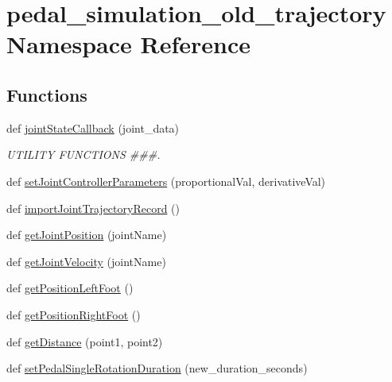 \hypertarget{namespacepedal__simulation__old__trajectory}{}\section{pedal\+\_\+simulation\+\_\+old\+\_\+trajectory Namespace Reference}
\label{namespacepedal__simulation__old__trajectory}
\subsection*{Functions}
\begin{DoxyCompactItemize}
\item 
def \mbox{\hyperlink{namespacepedal__simulation__old__trajectory_a3e93dcb2724e43d0bcadfac8b5937e15}{joint\+State\+Callback}} (joint\+\_\+data)
\begin{DoxyCompactList}\small\item\em U\+T\+I\+L\+I\+TY F\+U\+N\+C\+T\+I\+O\+NS \#\#\#. \end{DoxyCompactList}\item 
def \mbox{\hyperlink{namespacepedal__simulation__old__trajectory_a464ab98b7818abf9276eb03f5680686c}{set\+Joint\+Controller\+Parameters}} (proportional\+Val, derivative\+Val)
\item 
def \mbox{\hyperlink{namespacepedal__simulation__old__trajectory_ae81389d597608204ae0f5d39c8736762}{import\+Joint\+Trajectory\+Record}} ()
\item 
def \mbox{\hyperlink{namespacepedal__simulation__old__trajectory_a831499f57388b2e8b3fd0ec1f090215c}{get\+Joint\+Position}} (joint\+Name)
\item 
def \mbox{\hyperlink{namespacepedal__simulation__old__trajectory_a4be686c7eafb60e2aced8b3ae18ee75b}{get\+Joint\+Velocity}} (joint\+Name)
\item 
def \mbox{\hyperlink{namespacepedal__simulation__old__trajectory_a4957cc05827c10fc9f476b42691abb8a}{get\+Position\+Left\+Foot}} ()
\item 
def \mbox{\hyperlink{namespacepedal__simulation__old__trajectory_aa7aea8a154bfab646435f6d45a6afeb8}{get\+Position\+Right\+Foot}} ()
\item 
def \mbox{\hyperlink{namespacepedal__simulation__old__trajectory_af5ec9483124d1db0377a9cfda7b732d1}{get\+Distance}} (point1, point2)
\item 
def \mbox{\hyperlink{namespacepedal__simulation__old__trajectory_a9b172e7ce7b57b949598c4deb77ddeed}{set\+Pedal\+Single\+Rotation\+Duration}} (new\+\_\+duration\+\_\+seconds)

\end{DoxyCompactItemize}
